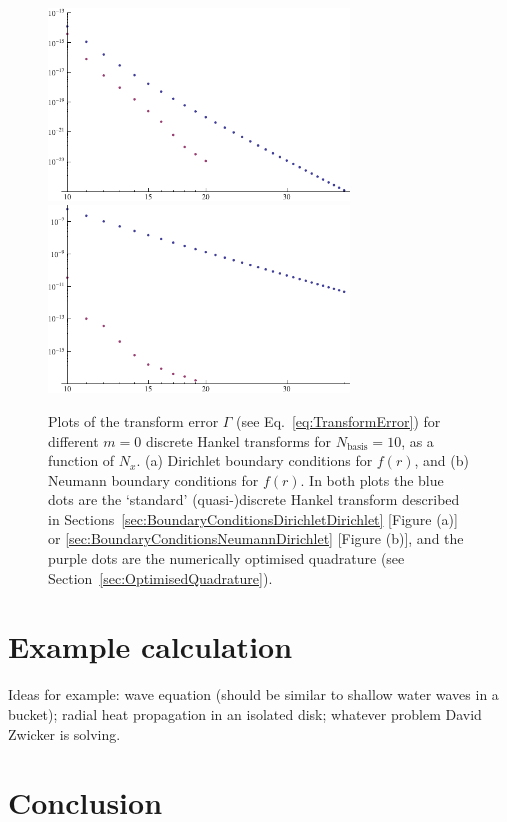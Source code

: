 \documentclass[aip,amsmath,amssymb,reprint,twocolumn]{revtex4-1}
\newcommand{\Nbasis}{{N_{\text{basis}}}}
\newcommand{\Nx}{{N_{x}}}
\begin{document}
\begin{figure}
  \includegraphics[width=8cm]{BesselDirichletMatrixNormErrorScaling}
  \includegraphics[width=8cm]{BesselNeumannMatrixNormErrorScaling}
  \caption{Plots of the transform error $\Gamma$ (see Eq.~\eqref{eq:TransformError}) for different $m=0$ discrete Hankel transforms for $\Nbasis=10$, as a function of $\Nx$.  (a) Dirichlet boundary conditions for $f(r)$, and (b) Neumann boundary conditions for $f(r)$.  In both plots the blue dots are the `standard' (quasi-)discrete Hankel transform described in Sections~\ref{sec:BoundaryConditionsDirichletDirichlet} [Figure (a)] or \ref{sec:BoundaryConditionsNeumannDirichlet} [Figure (b)], and the purple dots are the numerically optimised quadrature (see Section~\ref{sec:OptimisedQuadrature}). \label{fig:TransformErrorScaling}}
\end{figure}


\section{Example calculation}
\label{sec:Example}
Ideas for example: wave equation (should be similar to shallow water waves in a bucket); radial heat propagation in an isolated disk; whatever problem David Zwicker is solving.

\section{Conclusion}
\label{sec:Conclusion}
\end{document}
